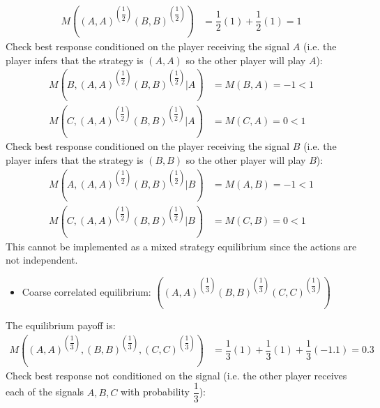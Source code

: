 \documentclass{article}
\begin{document}
\begin{align*}
M\left(\left(A,A\right)^{\left(\dfrac{1}{2}\right)}\left(B,B\right)^{\left(\dfrac{1}{2}\right)}\right)  &= \dfrac{1}{2} \left(1\right) + \dfrac{1}{2} \left(1\right) = 1
\end{align*}
Check best response conditioned on the player receiving the signal $A $ (i.e. the player infers that the strategy is $\left(A , A \right)$ so the other player will play $A $):
\begin{align*}
M\left(B, \left(A,A\right)^{\left(\dfrac{1}{2}\right)}\left(B,B\right)^{\left(\dfrac{1}{2}\right)} | A\right)  &= M\left(B, A\right) = -1 < 1
\\ M\left(C, \left(A,A\right)^{\left(\dfrac{1}{2}\right)}\left(B,B\right)^{\left(\dfrac{1}{2}\right)} | A\right)  &= M\left(C, A\right) = 0 < 1
\end{align*}
Check best response conditioned on the player receiving the signal $B $ (i.e. the player infers that the strategy is $\left(B , B \right)$ so the other player will play $B $):
\begin{align*}
M\left(A, \left(A,A\right)^{\left(\dfrac{1}{2}\right)}\left(B,B\right)^{\left(\dfrac{1}{2}\right)} | B\right)  &= M\left(A, B\right) = -1 < 1
\\ M\left(C, \left(A,A\right)^{\left(\dfrac{1}{2}\right)}\left(B,B\right)^{\left(\dfrac{1}{2}\right)} | B\right)  &= M\left(C, B\right) = 0 < 1
\end{align*}
This cannot be implemented as a mixed strategy equilibrium since the actions are not independent.
\begin{itemize}
\item Coarse correlated equilibrium: $\left(\left(A,A \right)^{\left(\dfrac{1}{3}\right)}\left(B,B\right)^{\left(\dfrac{1}{3}\right)}\left(C,C\right)^{\left(\dfrac{1}{3}\right)}\right)$
\end{itemize}The equilibrium payoff is:
\begin{align*}
M\left(\left(A,A\right)^{\left(\dfrac{1}{3}\right)},\left(B,B\right)^{\left(\dfrac{1}{3}\right)},\left(C,C\right)^{\left(\dfrac{1}{3}\right)}\right)  &= \dfrac{1}{3} \left(1\right) + \dfrac{1}{3} \left(1\right) + \dfrac{1}{3} \left(-1.1\right) = 0.3
\end{align*}
Check best response not conditioned on the signal (i.e. the other player receives each of the signals $A , B , C $ with probability $\dfrac{1}{3}$):
\end{document}
